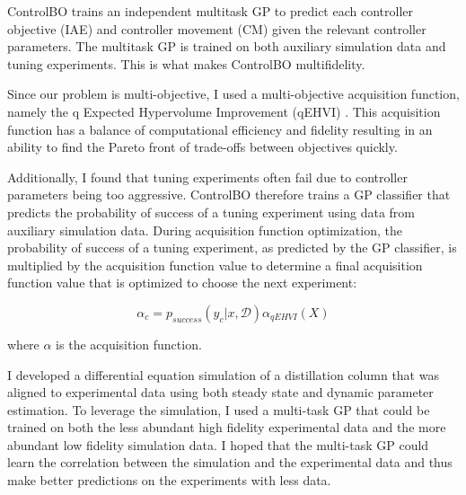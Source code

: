 ControlBO trains an independent multitask GP to predict each controller objective (IAE) and controller movement (CM) given the relevant controller parameters. The multitask GP is trained on both auxiliary simulation data and tuning experiments. This is what makes ControlBO multifidelity.

Since our problem is multi-objective, I used a multi-objective acquisition function, namely the q Expected Hypervolume Improvement (qEHVI) \cite{Balandat2020}. This acquisition function has a balance of computational efficiency and fidelity resulting in an ability to find the Pareto front of trade-offs between objectives quickly. 

Additionally, I found that tuning experiments often fail due to controller parameters being too aggressive. ControlBO therefore trains a GP classifier that predicts the probability of success of a tuning experiment using data from auxiliary simulation data. During acquisition function optimization, the probability of success of a tuning experiment, as predicted by the GP classifier, is multiplied by the acquisition function value to determine a final acquisition function value that is optimized to choose the next experiment:

\begin{equation}
    \alpha_{c} = p_{success}(y_c \vert x, \mathcal D) \alpha_{qEHVI}(X)
\end{equation}

where $\alpha$ is the acquisition function.

I developed a differential equation simulation of a distillation column that was aligned to experimental data using both steady state and dynamic parameter estimation. To leverage the simulation, I used a multi-task GP that could be trained on both the less abundant high fidelity experimental data and the more abundant low fidelity simulation data. I hoped that the multi-task GP could learn the correlation between the simulation and the experimental data and thus make better predictions on the experiments with less data.


